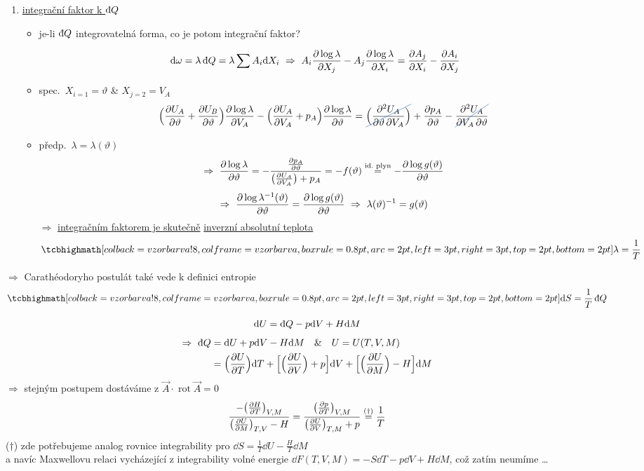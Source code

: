 \begin{enumerate}[label=\alph*),start=4]
  \item \underline{integrační faktor k $\dbar Q$}
  \begin{itemize}
    \item je-li $\dbar Q$ integrovatelná forma, co je potom integrační faktor?
  \end{itemize}
  \[
    \dd\omega = \lambda\,\dbar Q = \lambda\sum A_i\dd X_i
    \ \Rightarrow\ A_i\pdv{\log\lambda}{X_j} - A_j\pdv{\log\lambda}{X_i} = \pdv{A_j}{X_i} - \pdv{A_i}{X_j}
  \]
  \begin{itemize}
    \item spec.\ $X_{i=1} = \vartheta$ \& $X_{j=2} = V_A$
    \[
      \Big(\pdv{U_A}{\vartheta} + \pdv{U_B}{\vartheta}\Big)\pdv{\log\lambda}{V_A} - \Big(\pdv{U_A}{V_A} + p_A\Big)\pdv{\log\lambda}{\vartheta}
      = \xcancel{\Big(\frac{\partial^2U_A}{\partial\vartheta\,\partial V_A}\Big)} + \pdv{p_A}{\vartheta} - \xcancel{\frac{\partial^2U_A}{\partial V_A\,\partial\vartheta}}
    \]
    \item předp.\ $\lambda = \lambda(\vartheta)$
    \[
      \Rightarrow\ \pdv{\log\lambda}{\vartheta} = -\frac{\pdv{p_A}{\vartheta}}{\big(\pdv{U_A}{V_A}\big) + p_A} = -f(\vartheta)
      \overset{\text{id.\ plyn}}{=} -\pdv{\log g(\vartheta)}{\vartheta}
    \]
    \[
      \Rightarrow\ \pdv{\log\lambda^{-1}(\vartheta)}{\vartheta} = \pdv{\log g(\vartheta)}{\vartheta}
      \ \Rightarrow\ \lambda(\vartheta)^{-1} = g(\vartheta)
    \]
    $\Rightarrow$ \underline{integračním faktorem je skutečně} \underline{inverzní absolutní teplota}
    \[ \vzorec{\lambda = \frac1T} \]
  \end{itemize}
\end{enumerate}
$\Rightarrow$ Carathéodoryho postulát také vede k definici entropie
\[ \vzorec{\dd S = \frac1T\,\dbar Q} \]
\begin{priklad}
\[ \dd U = \dbar Q - p\dd V + H\dd M \]
\begin{align*}
  \Rightarrow\ \dbar Q &= \dd U + p\dd V - H\dd M \quad\&\quad U = U(T,V,M) \\
  &= \Big(\pdv{U}{T}\Big)\dd T + \Big[\Big(\pdv{U}{V}\Big) + p\Big]\dd V + \Big[\Big(\pdv{U}{M}\Big) - H\Big]\dd M
\end{align*}
$\Rightarrow$ stejným postupem dostáváme z $\vec A\cdot\operatorname{rot}\vec A = 0$
\[
  \frac{-\big(\pdv{H}{T}\big)_{V,M}}{\big(\pdv{U}{M}\big)_{T,V} - H}
  = \frac{\big(\pdv{p}{T}\big)_{V,M}}{\big(\pdv{U}{V}\big)_{T,M} + p} \overset{(\dagger)}{=} \frac1T
\]
($\dagger$) zde potřebujeme analog rovnice integrability pro $\dd S = \frac1T\dd U - \frac HT\dd M$ \\
\quad a navíc Maxwellovu relaci vycházející z integrability volné energie $\dd F(T,V,M) = -S\dd T - p\dd V + H\dd M$, což zatím neumíme \dots
\end{priklad}
